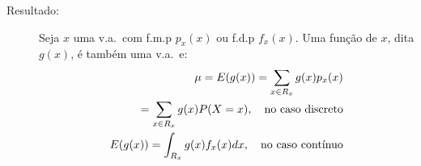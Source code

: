 \begin{description}


   \item [Resultado:] Seja $x$ uma v.a.\ com f.m.p $p_{x}(x)$ ou f.d.p $f_{x}(x)$. Uma função
     de $x$, dita $g(x)$, é também uma v.a.\ e: 
     \begin{align}
       \mu=E(g(x))=\sum_{x \in R_{x}} g(x)p_{x}(x)\\
       =\sum_{x \in R_{x}} g(x)P(X=x), \text{\quad no caso discreto} \nonumber \\
       E(g(x))=\int_{R_{x}} g(x)f_{x}(x)dx, \text{\quad no caso contínuo}
     \end{align}

 \end{description}

